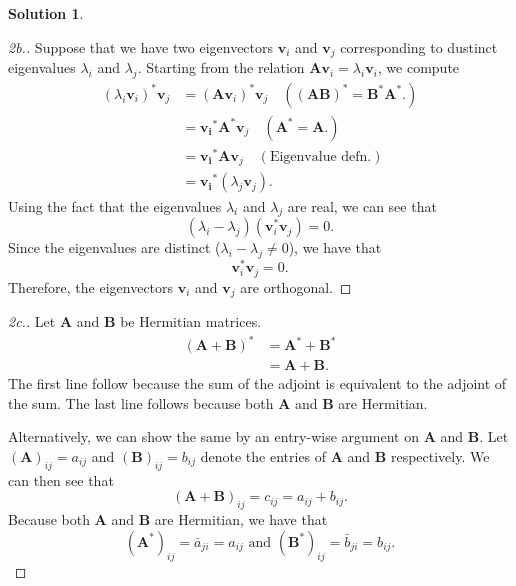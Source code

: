 \documentclass[12pt]{article}
\renewcommand{\vec}[1]{\mathbf{#1}}
\theoremstyle{definition}
\newtheorem{sol}{Solution}
\theoremstyle{remark}
\begin{document}
\begin{sol}
    \begin{proof}[2b.]
        Suppose that we have two eigenvectors $\vec{v}_i$ and $\vec{v}_j$ corresponding to dustinct eigenvalues $\lambda_i$ and $\lambda_j$. Starting from the relation $\vec{Av}_i = \lambda_i\vec{v}_i$, we compute
        \begin{align}
            (\lambda_i \vec{v}_i)^*\vec{v}_j &= (\vec{A}\vec{v}_i)^*\vec{v}_j \quad ((\vec{AB})^* = \vec{B}^*\vec{A}^*.) \\
                                             &= \vec{v_i}^*\vec{A}^*\vec{v}_j  \quad ( \vec{A}^* = \vec{A}. )\\
                                             &= \vec{v_i}^*\vec{A}\vec{v}_j \quad (\text{Eigenvalue defn.})\\
                                             &= \vec{v_i}^*(\lambda_j\vec{v}_j).
        \end{align}
Using the fact that the eigenvalues $\lambda_i$ and $\lambda_j$ are real, we can see that
        \begin{equation}
            (\lambda_i - \lambda_j) (\vec{v}_i^*\vec{v}_j) = 0.
        \end{equation}
Since the eigenvalues are distinct ($\lambda_i - \lambda_j \neq 0$), we have that
\begin{equation}
            \vec{v}_i^*\vec{v}_j = 0.
\end{equation}
Therefore, the eigenvectors $\vec{v}_i$ and $\vec{v}_j$ are orthogonal.

    \end{proof}

    \begin{proof}[2c.] Let $\vec{A}$ and $\vec{B}$ be Hermitian matrices.
        \begin{align}
            (\vec{A} + \vec{B})^* &= \vec{A}^* + \vec{B}^* \\
                                  &= \vec{A} + \vec{B}.
        \end{align}
        The first line follow because the sum of the adjoint is equivalent to the adjoint of the sum. The last line follows because both $\vec{A}$ and $\vec{B}$ are Hermitian. 

Alternatively, we can show the same by an entry-wise argument on $\vec{A}$ and $\vec{B}$. Let $(\vec{A})_{ij} = a_{ij}$ and $(\vec{B})_{ij} = b_{ij}$ denote the entries of $\vec{A}$ and $\vec{B}$ respectively. We can then see that
        \begin{equation}
            (\vec{A}+\vec{B})_{ij} = c_{ij} = a_{ij} + b_{ij}.
        \end{equation} 
Because both $\vec{A}$ and $\vec{B}$ are Hermitian, we have that
\begin{equation}
    (\vec{A}^*)_{ij} = \bar{a}_{ji} = a_{ij} \text{ and } (\vec{B}^*)_{ij} = \bar{b}_{ji} = b_{ij}.
\end{equation}


\end{proof}
\end{sol}
\end{document}
